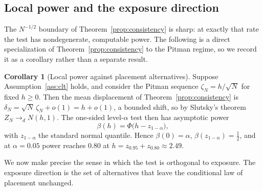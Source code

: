 \documentclass[preprint,12pt]{elsarticle}
\theoremstyle{definition}
\newtheorem{corollary}[theorem]{Corollary}
\begin{document}
\subsection{Local power and the exposure direction}
\label{sec:local-power}

The $N^{-1/2}$ boundary of Theorem~\ref{prop:consistency} is sharp: at exactly
that rate the test has nondegenerate, computable power. The following is a direct
specialization of Theorem~\ref{prop:consistency} to the Pitman regime, so we
record it as a corollary rather than a separate result.

\begin{corollary}[Local power against placement alternatives]
\label{prop:local-power}
Suppose Assumption~\ref{ass:clt} holds, and consider the Pitman sequence
$\zeta_N=h/\sqrt N$ for fixed $h\ge0$. Then the mean displacement of
Theorem~\ref{prop:consistency} is $\delta_N=\sqrt N\,\zeta_N+o(1)=h+o(1)$, a
bounded shift, so by Slutsky's theorem $Z_N\to_d N(h,1)$. The one-sided
level-$\alpha$ test then has asymptotic power
\[
\beta(h)=\Phi\big(h-z_{1-\alpha}\big),
\]
with $z_{1-\alpha}$ the standard normal quantile. Hence $\beta(0)=\alpha$,
$\beta(z_{1-\alpha})=\tfrac12$, and at $\alpha=0.05$ power reaches $0.80$ at
$h=z_{0.95}+z_{0.80}\approx2.49$.
\end{corollary}

We now make precise the sense in which the test is orthogonal to exposure. The
exposure direction is the set of alternatives that leave the conditional law of
placement unchanged.
\end{document}

